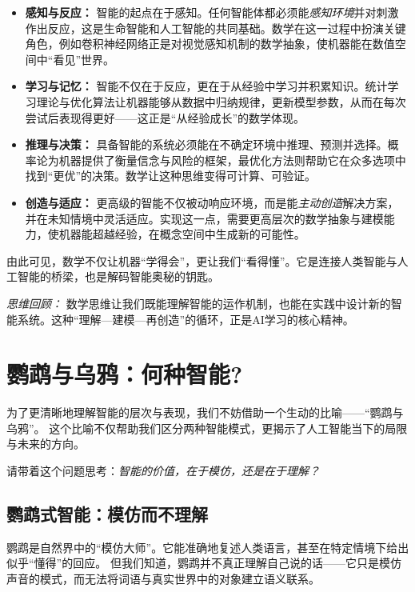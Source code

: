 \begin{itemize}
\item \textbf{感知与反应：} 智能的起点在于感知。任何智能体都必须能\emph{感知环境}并对刺激作出反应，这是生命智能和人工智能的共同基础。数学在这一过程中扮演关键角色，例如卷积神经网络正是对视觉感知机制的数学抽象，使机器能在数值空间中“看见”世界。

\item \textbf{学习与记忆：} 智能不仅在于反应，更在于从经验中学习并积累知识。统计学习理论与优化算法让机器能够从数据中归纳规律，更新模型参数，从而在每次尝试后表现得更好——这正是“从经验成长”的数学体现。

\item \textbf{推理与决策：} 具备智能的系统必须能在不确定环境中推理、预测并选择。概率论为机器提供了衡量信念与风险的框架，最优化方法则帮助它在众多选项中找到“更优”的决策。数学让这种思维变得可计算、可验证。

\item \textbf{创造与适应：} 更高级的智能不仅被动响应环境，而是能\emph{主动创造}解决方案，并在未知情境中灵活适应。实现这一点，需要更高层次的数学抽象与建模能力，使机器能超越经验，在概念空间中生成新的可能性。
\end{itemize}

由此可见，数学不仅让机器“学得会”，更让我们“看得懂”。它是连接人类智能与人工智能的桥梁，也是解码智能奥秘的钥匙。

\noindent\textit{思维回顾：} 数学思维让我们既能理解智能的运作机制，也能在实践中设计新的智能系统。这种“理解—建模—再创造”的循环，正是AI学习的核心精神。


\section{鹦鹉与乌鸦：何种智能?}

为了更清晰地理解智能的层次与表现，我们不妨借助一个生动的比喻——“鹦鹉与乌鸦”。
这个比喻不仅帮助我们区分两种智能模式，更揭示了人工智能当下的局限与未来的方向。

请带着这个问题思考：\emph{智能的价值，在于模仿，还是在于理解？}

\subsection{鹦鹉式智能：模仿而不理解}

鹦鹉是自然界中的“模仿大师”。它能准确地复述人类语言，甚至在特定情境下给出似乎“懂得”的回应。
但我们知道，鹦鹉并不真正理解自己说的话——它只是模仿声音的模式，而无法将词语与真实世界中的对象建立语义联系。

